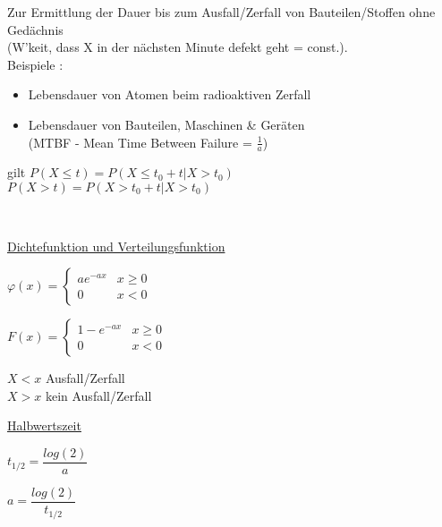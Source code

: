 \begin{minipage}{0.6\textwidth}
	Zur Ermittlung der Dauer bis zum Ausfall/Zerfall von Bauteilen/Stoffen ohne Gedächnis\\
	(W'keit, dass X in der nächsten Minute defekt geht = const.).\\
	Beispiele :
	\begin{itemize}
		\item Lebensdauer von Atomen beim radioaktiven Zerfall
		\item Lebensdauer von Bauteilen, Maschinen \& Geräten\\(MTBF -
		Mean Time Between Failure = $\frac{1}{a}$)
	\end{itemize}
	
	gilt $P(X \leq t) = P(X \leq t_0 + t | X > t_0)$\\
	$P(X > t) = P(X > t_0 + t | X > t_0)$\\
	
	
\end{minipage} \hspace{0.05\textwidth}
\begin{minipage}{0.35\textwidth}
	
\end{minipage}\\[5pt]
\begin{minipage}[t]{0.6\textwidth}
	\underline{Dichtefunktion und Verteilungsfunktion}
	\begin{multicols}{2}
		$\varphi(x)=\begin{cases}
		a e^{-a x}  & x \geq 0\\
		0						& x < 0
		\end{cases}$
		
		$F(x)=\begin{cases}
		1-e^{-a x}  		& x \geq 0\\
		0	 					& x < 0
		\end{cases}$\\
		
		\columnbreak
		
		$X < x$ Ausfall/Zerfall\\
		$X > x$ kein Ausfall/Zerfall
	\end{multicols} 
\end{minipage}
\begin{minipage}[t]{0.4\textwidth}
	\underline{Halbwertszeit}
	\begin{multicols}{2}
		$ t_{1/2} = \dfrac{log(2)}{a} $
		
		\columnbreak
		
		$ a = \dfrac{log(2)}{t_{1/2}} $		
	\end{multicols}
	
\end{minipage}

